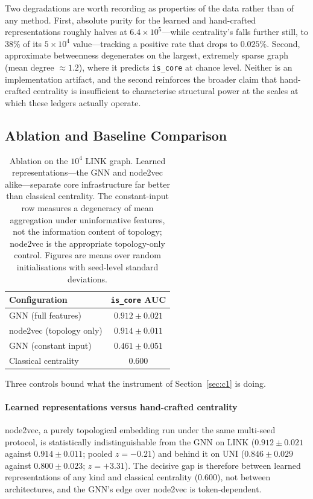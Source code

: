 \documentclass[final,5p,times]{elsarticle}
\begin{document}
Two degradations are worth recording as properties of the data rather than
of any method. First, absolute purity for the learned and hand-crafted
representations roughly halves at $6.4\times10^5$---while centrality's falls
further still, to $38\%$ of its $5\times10^4$ value---tracking a positive rate
that drops to $0.025\%$.
Second, approximate betweenness degenerates on the largest, extremely
sparse graph (mean degree $\approx 1.2$), where it predicts
\texttt{is\_core} at chance level. Neither is an implementation artifact,
and the second reinforces the broader claim that hand-crafted centrality is
insufficient to characterise structural power at the scales at which these
ledgers actually operate.

\subsection{Ablation and Baseline Comparison}
\label{sec:ablation}

\begin{table}[H]
\centering
\caption{Ablation on the $10^4$ LINK graph. Learned representations---the GNN
and node2vec alike---separate core infrastructure far better than classical
centrality. The constant-input row measures a degeneracy of mean aggregation
under uninformative features, not the information content of topology;
node2vec is the appropriate topology-only control. Figures are means over
random initialisations with seed-level standard deviations.}
\label{tab:ablation}
\begin{tabular}{lc}
\toprule
Configuration & \texttt{is\_core} AUC \\
\midrule
GNN (full features)        & $\mathbf{0.912 \pm 0.021}$ \\
node2vec (topology only)   & $\mathbf{0.914 \pm 0.011}$ \\
GNN (constant input)       & $0.461 \pm 0.051$ \\
Classical centrality       & $0.600$ \\
\bottomrule
\end{tabular}
\end{table}

Three controls bound what the instrument of Section~\ref{sec:c1} is doing.

\paragraph{Learned representations versus hand-crafted centrality}
node2vec, a purely topological embedding run under the same multi-seed
protocol, is statistically indistinguishable from the GNN on LINK
($0.912 \pm 0.021$ against $0.914 \pm 0.011$; pooled $z = -0.21$) and behind
it on UNI ($0.846 \pm 0.029$ against $0.800 \pm 0.023$; $z = +3.31$). The
decisive gap is therefore between learned representations of any kind and
classical centrality ($0.600$), not between architectures, and the GNN's
edge over node2vec is token-dependent.
\end{document}
